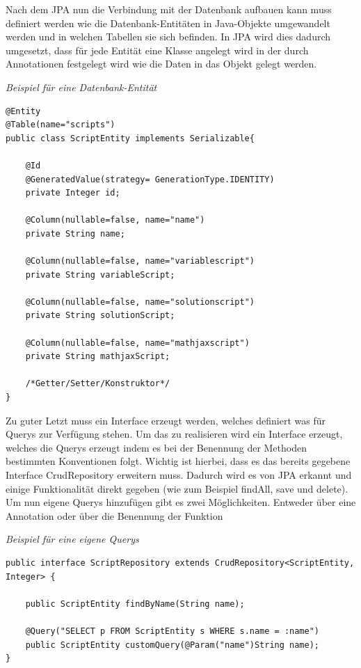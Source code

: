 Nach dem JPA nun die Verbindung mit der Datenbank aufbauen kann muss definiert werden wie die Datenbank-Entitäten in Java-Objekte umgewandelt werden und in welchen Tabellen sie sich befinden. In JPA wird dies dadurch umgesetzt, dass für jede Entität eine Klasse angelegt wird in der durch Annotationen festgelegt wird wie die Daten in das Objekt gelegt werden. \\

\begin{minipage}{\textwidth}
\emph{Beispiel für eine Datenbank-Entität}
\begin{lstlisting}
@Entity
@Table(name="scripts")
public class ScriptEntity implements Serializable{

	@Id
	@GeneratedValue(strategy= GenerationType.IDENTITY)
	private Integer id;
	
	@Column(nullable=false, name="name")
	private String name;
	
	@Column(nullable=false, name="variablescript")
	private String variableScript;
	
	@Column(nullable=false, name="solutionscript")
	private String solutionScript;

	@Column(nullable=false, name="mathjaxscript")
	private String mathjaxScript;
	
	/*Getter/Setter/Konstruktor*/
}
\end{lstlisting}
\end{minipage}

Zu guter Letzt muss ein Interface erzeugt werden, welches definiert was für Querys zur Verfügung stehen. Um das zu realisieren wird ein Interface erzeugt, welches die Querys erzeugt indem es bei der Benennung der Methoden bestimmten Konventionen folgt. Wichtig ist hierbei, dass es das bereits gegebene Interface CrudRepository erweitern muss. Dadurch wird es von JPA erkannt und einige Funktionalität direkt gegeben (wie zum Beispiel findAll, save und delete).
Um nun eigene Querys hinzufügen gibt es zwei Möglichkeiten. Entweder über eine Annotation oder über die Benennung der Funktion

\begin{minipage}{\textwidth}
\emph{Beispiel für eine eigene Querys}
\begin{lstlisting}
public interface ScriptRepository extends CrudRepository<ScriptEntity, Integer> {

	public ScriptEntity findByName(String name);
	
	@Query("SELECT p FROM ScriptEntity s WHERE s.name = :name")
	public ScriptEntity customQuery(@Param("name")String name);
}
\end{lstlisting}
\end{minipage}


